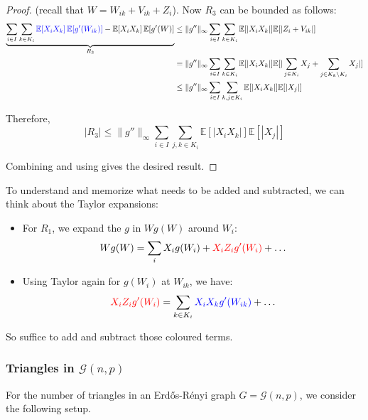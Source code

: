 \documentclass{article}
\begin{document}
\begin{proof}
(recall that $W = W_{ik} + V_{ik} + Z_i$). Now $R_3$ can be bounded as follows:
\begin{align*}
    \underbrace{\sum_{i\in I}\sum_{k\in K_{i}}\textcolor{blue}{\mathbb{E}[X_{i}X_{k}]\operatorname{\mathbb{E}}[g^{\prime}(W_{i k})]}-\mathbb{E}[X_{i}X_{k}]\operatorname{\mathbb{E}}[g^{\prime}(W)]}_{R_3} &\leq \|g''\|_\infty \sum_{i\in I}\sum_{k\in K_{i}}\mathbb{E}[|X_{i}X_{k}|]\mathbb{E}[|Z_i+V_{ik}|]\\
    &=\|g''\|_\infty \sum_{i\in I}\sum_{k\in K_{i}}\mathbb{E}[|X_{i}X_{k}|]\mathbb{E}[|\sum_{j\in K_i} X_j + \sum_{j\in K_k\setminus K_i} X_j|]\\
    &\leq \|g''\|_\infty \sum_{i\in I}\sum_{k,j\in K_{i}}\mathbb{E}[|X_{i}X_{k}|]\mathbb{E}[|X_j|]\\
\end{align*}

Therefore, 
\begin{equation}\label{eq:R3_bound}
    |R_3| \leq \|g''\|_\infty \sum_{i\in I}\sum_{j,k\in K_{i}}\mathbb{E}[|X_{i}X_{k}|]\mathbb{E}[|X_j|]
\end{equation}

Combining  and using  gives the desired result.  

\end{proof}

\begin{remark}
    To understand and memorize what needs to be added and subtracted, we can think about the Taylor expansions:
    \begin{itemize}
        \item For $R_1$, we expand the $g$ in $Wg(W)$ around $W_i$: 
        \[Wg(W) = \sum_i X_i g(W_i) + \textcolor{red}{X_i Z_i g'(W_i)} + \ldots \]
        \item Using Taylor again for $g(W_i)$ at $W_{ik}$, we have:
        \[
        \textcolor{red}{X_i Z_i g'(W_i)} = \sum_{k\in K_i} \textcolor{blue}{X_i X_k g'(W_{ik})} + \ldots
            \]
    \end{itemize}
    So suffice to add and subtract those coloured terms.  
\end{remark}

\subsubsection{Triangles in $\mathcal{G}(n,p)$}
For the number of triangles in an Erd\H{o}s-R\'{e}nyi graph $G=\mathcal{G}(n,p)$, we consider the following setup.  
\end{document}
